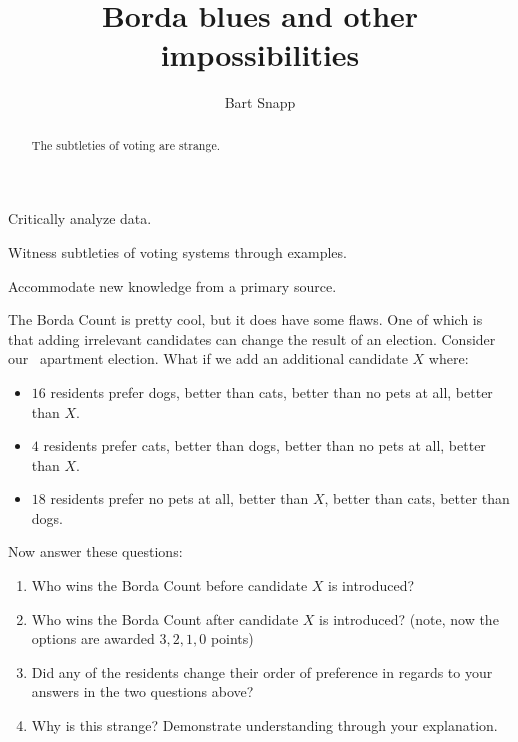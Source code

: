 \documentclass[nooutcomes,noauthor,hints,handout]{ximera}
\title{Borda blues and other impossibilities}
\author{Bart Snapp}
\begin{document}
\begin{abstract}
  The subtleties of voting are strange.
\end{abstract}
\maketitle

\begin{listOutcomes}
\item Critically analyze data.
\item Witness subtleties of voting systems through examples.
\item Accommodate new knowledge from a primary source. 
\end{listOutcomes}



\mynewpage

\begin{question}
The Borda Count is pretty cool, but it does have some flaws. One of
which is that adding irrelevant candidates can change the result of an
election. Consider our \mooculus~apartment election. What if we add an additional candidate $X$ where:

\begin{itemize}
\item $16$ residents prefer dogs, better than cats, better than no pets at all, better than $X$.
\item $4$ residents prefer cats, better than dogs, better than no pets at all, better than $X$.
\item $18$ residents prefer no pets at all, better than $X$, better than cats, better
  than dogs.
\end{itemize}
Now answer these questions:
\begin{enumerate}
\item Who wins the Borda Count before candidate $X$ is introduced?
\item Who wins the Borda Count after candidate $X$ is introduced? (note,
  now the options are awarded $3,2,1,0$ points)
\item Did any of the residents change their order of preference in
  regards to your answers in the two questions above?
\item Why is this strange? Demonstrate understanding through your
  explanation.
\end{enumerate}
\end{question}
\mynewpage
\end{document}
